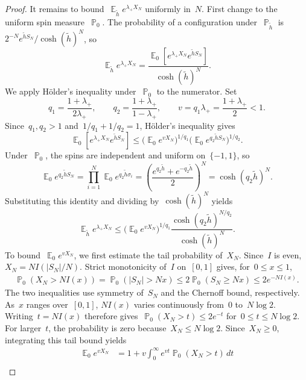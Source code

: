 \documentclass[letterpaper,11pt,reqno]{amsart}
\renewcommand{\leq}{\leqslant}
\renewcommand{\geq}{\geqslant}
\DeclareMathOperator{\E}{\mathds{E}}
\DeclareMathOperator{\pr}{\mathds{P}}
\begin{document}
\begin{proof}
It remains to bound~$\E_{\widetilde h}e^{\lambda_+X_N}$ uniformly in~$N$. First change to the uniform spin measure~$\pr_0$. The probability of a configuration under~$\pr_{\widetilde h}$ is~$2^{-N}e^{\widetilde hS_N}/\cosh(\widetilde h)^N$, so
\begin{equation*}
\E_{\widetilde h}e^{\lambda_+X_N}
=\frac{\E_0\!\left[e^{\lambda_+X_N}e^{\widetilde hS_N}\right]}
{\cosh(\widetilde h)^N}.
\end{equation*}
We apply H\"older's inequality under~$\pr_0$ to the numerator. Set
\begin{equation*}
q_1=\frac{1+\lambda_+}{2\lambda_+},
\qquad q_2=\frac{1+\lambda_+}{1-\lambda_+},
\qquad v=q_1\lambda_+=\frac{1+\lambda_+}{2}<1.
\end{equation*}
Since~$q_1,q_2>1$ and~$1/q_1+1/q_2=1$, H\"older's inequality gives
\begin{equation*}
\E_0\!\left[e^{\lambda_+X_N}e^{\widetilde hS_N}\right]
\leq\bigl(\E_0e^{vX_N}\bigr)^{1/q_1}
\bigl(\E_0e^{q_2\widetilde hS_N}\bigr)^{1/q_2}.
\end{equation*}
Under~$\pr_0$, the spins are independent and uniform on~$\{-1,1\}$, so
\begin{equation*}
\E_0e^{q_2\widetilde hS_N}
=\prod_{i=1}^N\E_0e^{q_2\widetilde h\sigma_i}
=\left(\frac{e^{q_2\widetilde h}+e^{-q_2\widetilde h}}2\right)^N
=\cosh(q_2\widetilde h)^N.
\end{equation*}
Substituting this identity and dividing by~$\cosh(\widetilde h)^N$ yields
\begin{equation*}
\E_{\widetilde h}e^{\lambda_+X_N}
\leq\bigl(\E_0e^{vX_N}\bigr)^{1/q_1}
\frac{\cosh(q_2\widetilde h)^{N/q_2}}{\cosh(\widetilde h)^N}.
\end{equation*}
To bound~$\E_0e^{vX_N}$, we first estimate the tail probability of~$X_N$. Since~$I$ is even, $X_N=NI(|S_N|/N)$. Strict monotonicity of~$I$ on~$[0,1]$ gives, for~$0\leq x\leq1$,
\begin{align*}
\pr_0(X_N>NI(x))
=\pr_0(|S_N|>Nx)
\leq2\pr_0(S_N\geq Nx)
\leq2e^{-NI(x)}.
\end{align*}
The two inequalities use symmetry of~$S_N$ and the Chernoff bound, respectively. As~$x$ ranges over~$[0,1]$, $NI(x)$ varies continuously from~$0$ to~$N\log2$. Writing~$t=NI(x)$ therefore gives~$\pr_0(X_N>t)\leq2e^{-t}$ for~$0\leq t\leq N\log2$. For larger~$t$, the probability is zero because~$X_N\leq N\log2$. Since~$X_N\geq0$, integrating this tail bound yields
\begin{align*}
\E_0e^{vX_N}
&=1+v\int_0^\infty e^{vt}\pr_0(X_N>t)\,dt\\

\end{align*}
\end{proof}
\end{document}
